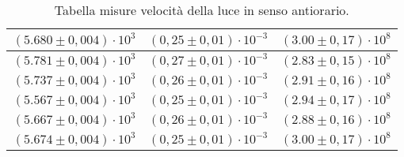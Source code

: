\begin{table}[H]
\begin{tabular}{|c|c|c|}
        \hline
        $ (5.680 \pm 0,004) \cdot 10^{3} $ & $ (0,25 \pm 0,01) \cdot 10^{-3} $ & $ (3.00 \pm 0,17) \cdot 10^{8} $\\
        \hline
        $ (5.781 \pm 0,004) \cdot 10^{3} $ & $ (0,27 \pm 0,01) \cdot 10^{-3} $ & $ (2.83 \pm 0,15) \cdot 10^{8} $\\
        \hline
        $ (5.737 \pm 0,004) \cdot 10^{3} $ & $ (0,26 \pm 0,01) \cdot 10^{-3} $ & $ (2.91 \pm 0,16) \cdot 10^{8} $\\
        \hline
        $ (5.567 \pm 0,004) \cdot 10^{3} $ & $ (0,25 \pm 0,01) \cdot 10^{-3} $ & $ (2.94 \pm 0,17) \cdot 10^{8} $\\
        \hline
        $ (5.667 \pm 0,004) \cdot 10^{3} $ & $ (0,26 \pm 0,01) \cdot 10^{-3} $ & $ (2.88 \pm 0,16) \cdot 10^{8} $\\
        \hline
        $ (5.674 \pm 0,004) \cdot 10^{3} $ & $ (0,25 \pm 0,01) \cdot 10^{-3} $ & $ (3.00 \pm 0,17) \cdot 10^{8} $\\
        \hline
        \end{tabular}
    \caption{Tabella misure velocità della luce in senso antiorario.}
\end{table}